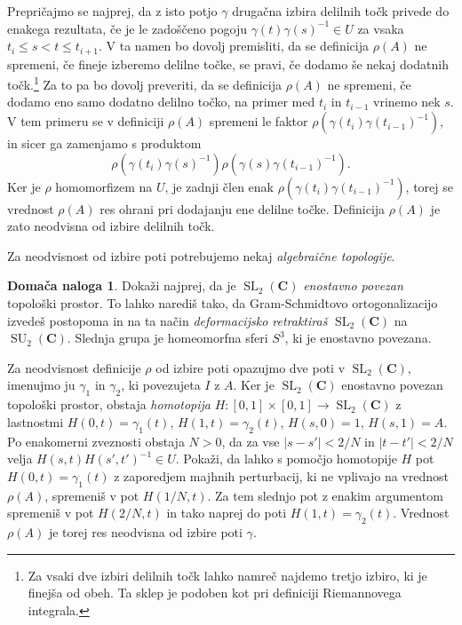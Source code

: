 \documentclass[11pt]{book}
\def\CC{\mathbf{C}}
\DeclareMathOperator\SU{SU}
\DeclareMathOperator\SL{SL}
\theoremstyle{definition}
\theoremstyle{zgled}
\theoremstyle{zgledbrezstevilke}
\theoremstyle{odprtproblem}
\theoremstyle{domacanaloga}
\newtheorem{domacanaloga}[theorem]{Domača naloga}
\theoremstyle{izrek}
\begin{document}
Prepričajmo se najprej, da z isto potjo $\gamma$ drugačna izbira delilnih točk privede do enakega rezultata, če je le zadoščeno pogoju $\gamma(t) \gamma(s)^{-1} \in U$ za vsaka $t_i \leq s < t \leq t_{i+1}$. V ta namen bo dovolj premisliti, da se definicija $\rho(A)$ ne spremeni, če fineje izberemo delilne točke, se pravi, če dodamo še nekaj dodatnih točk.\footnote{Za vsaki dve izbiri delilnih točk lahko namreč najdemo tretjo izbiro, ki je finejša od obeh. Ta sklep je podoben kot pri definiciji Riemannovega integrala.} Za to pa bo dovolj preveriti, da se definicija $\rho(A)$ ne spremeni, če dodamo eno samo dodatno delilno točko, na primer med $t_i$ in $t_{i-1}$ vrinemo nek $s$. V tem primeru se v definiciji $\rho(A)$ spremeni le faktor $\rho(\gamma(t_i) \gamma(t_{i-1})^{-1})$, in sicer ga zamenjamo s produktom
\[
    \rho(\gamma(t_i) \gamma(s)^{-1}) 
    \rho(\gamma(s) \gamma(t_{i-1})^{-1}).
\]
Ker je $\rho$ homomorfizem na $U$, je zadnji člen enak $\rho(\gamma(t_i) \gamma(t_{i-1})^{-1})$, torej se vrednost $\rho(A)$ res ohrani pri dodajanju ene delilne točke. Definicija $\rho(A)$ je zato neodvisna od izbire delilnih točk.

Za neodvisnost od izbire poti potrebujemo nekaj \emph{algebraične topologije}.

\begin{domacanaloga}
Dokaži najprej, da je $\SL_2(\CC)$ \emph{enostavno povezan} topološki prostor. To lahko narediš tako, da Gram-Schmidtovo ortogonalizacijo izvedeš postopoma in na ta način \emph{deformacijsko retraktiraš} $\SL_2(\CC)$ na $\SU_2(\CC)$. Slednja grupa je homeomorfna sferi $S^3$, ki je enostavno povezana.

Za neodvisnost definicije $\rho$ od izbire poti opazujmo dve poti v $\SL_2(\CC)$, imenujmo ju $\gamma_1$ in $\gamma_2$, ki povezujeta $I$ z $A$. Ker je $\SL_2(\CC)$ enostavno povezan topološki prostor, obstaja \emph{homotopija} $H \colon [0,1] \times [0,1] \to \SL_2(\CC)$ z lastnostmi $H(0,t) = \gamma_1(t)$, $H(1,t) = \gamma_2(t)$, $H(s, 0) = 1$, $H(s,1) = A$. Po enakomerni zveznosti obstaja $N > 0$, da za vse $| s - s' | < 2/N$ in $| t - t'| < 2/N$ velja $H(s,t)H(s',t')^{-1} \in U$. Pokaži, da lahko s pomočjo homotopije $H$ pot $H(0,t) = \gamma_1(t)$ z zaporedjem majhnih perturbacij, ki ne vplivajo na vrednost $\rho(A)$, spremeniš v pot $H(1/N, t)$. Za tem slednjo pot z enakim argumentom spremeniš v pot $H(2/N, t)$ in tako naprej do poti $H(1,t) = \gamma_2(t)$. Vrednost $\rho(A)$ je torej res neodvisna od izbire poti $\gamma$.
\end{domacanaloga}
\end{document}
